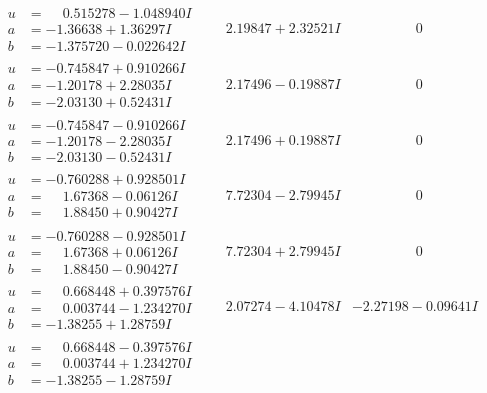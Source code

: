 \documentclass[1p]{elsarticle_modified}
\theoremstyle{definition}
\begin{document}
$$\begin{array}{c|c|c}
\begin{aligned}
u &= \phantom{-}0.515278 - 1.048940 I \\
a &= -1.36638 + 1.36297 I \\
b &= -1.375720 - 0.022642 I\end{aligned}
 & \phantom{-}2.19847 + 2.32521 I & \phantom{-0.000000 } 0 \\ \hline\begin{aligned}
u &= -0.745847 + 0.910266 I \\
a &= -1.20178 + 2.28035 I \\
b &= -2.03130 + 0.52431 I\end{aligned}
 & \phantom{-}2.17496 - 0.19887 I & \phantom{-0.000000 } 0 \\ \hline\begin{aligned}
u &= -0.745847 - 0.910266 I \\
a &= -1.20178 - 2.28035 I \\
b &= -2.03130 - 0.52431 I\end{aligned}
 & \phantom{-}2.17496 + 0.19887 I & \phantom{-0.000000 } 0 \\ \hline\begin{aligned}
u &= -0.760288 + 0.928501 I \\
a &= \phantom{-}1.67368 - 0.06126 I \\
b &= \phantom{-}1.88450 + 0.90427 I\end{aligned}
 & \phantom{-}7.72304 - 2.79945 I & \phantom{-0.000000 } 0 \\ \hline\begin{aligned}
u &= -0.760288 - 0.928501 I \\
a &= \phantom{-}1.67368 + 0.06126 I \\
b &= \phantom{-}1.88450 - 0.90427 I\end{aligned}
 & \phantom{-}7.72304 + 2.79945 I & \phantom{-0.000000 } 0 \\ \hline\begin{aligned}
u &= \phantom{-}0.668448 + 0.397576 I \\
a &= \phantom{-}0.003744 - 1.234270 I \\
b &= -1.38255 + 1.28759 I\end{aligned}
 & \phantom{-}2.07274 - 4.10478 I & -2.27198 - 0.09641 I \\ \hline\begin{aligned}
u &= \phantom{-}0.668448 - 0.397576 I \\
a &= \phantom{-}0.003744 + 1.234270 I \\
b &= -1.38255 - 1.28759 I\end{aligned}

\end{array}$$
\end{document}
